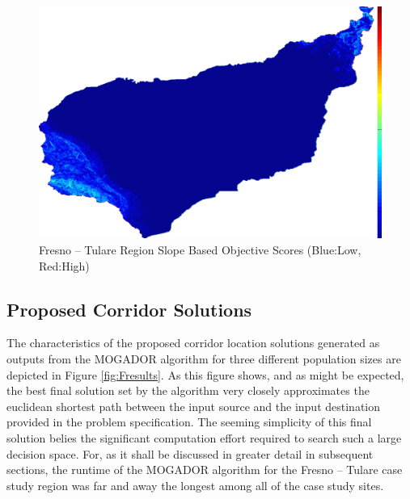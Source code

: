         \begin{figure}[!h]
            \begin{center}
            \includegraphics[width=5.5in]{figures/Fresno_SlopeScore.png}   
            \caption{Fresno -- Tulare Region Slope Based Objective Scores (Blue:Low, Red:High)}
            \label{fig:Fslope}
            \end{center}
        \end{figure}
        
    \subsection{Proposed Corridor Solutions}
    
The characteristics of the proposed corridor location solutions generated as outputs from the MOGADOR algorithm for three different population sizes are depicted in Figure \ref{fig:Fresults}. As this figure shows, and as might be expected, the best final solution set by the algorithm very closely approximates the euclidean shortest path between the input source and the input destination provided in the problem specification. The seeming simplicity of this final solution belies the significant computation effort required to search such a large decision space. For, as it shall be discussed in greater detail in subsequent sections, the runtime of the MOGADOR algorithm for the Fresno -- Tulare case study region was far and away the longest among all of the case study sites. 
    
